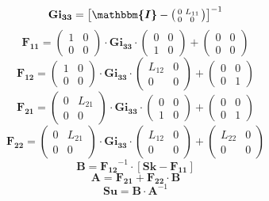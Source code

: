 \[ \mathbf{Gi_{33}} = \left[\boldsymbol{\mathbbm{I}}
-\left(\begin{smallmatrix} 0 & L_{11} \\ 0 & 0
\end{smallmatrix}\right)\right]^{-1} \]
\[ \mathbf{F_{11}} = \left(\begin{smallmatrix} 1 & 0 \\ 0 & 0
\end{smallmatrix}\right) \cdot\mathbf{Gi_{33}}\cdot
\left(\begin{smallmatrix} 0 & 0 \\ 1 & 0 \end{smallmatrix}\right) +
\left(\begin{smallmatrix} 0 & 0 \\ 0 & 0 \end{smallmatrix}\right) \]
\[ \mathbf{F_{12}} = \left(\begin{smallmatrix} 1 & 0 \\ 0 & 0
\end{smallmatrix}\right) \cdot\mathbf{Gi_{33}}\cdot
\left(\begin{smallmatrix} L_{12} & 0 \\ 0 & 0 \end{smallmatrix}\right)
+ \left(\begin{smallmatrix} 0 & 0 \\ 0 & 1 \end{smallmatrix}\right) \]
\[ \mathbf{F_{21}} = \left(\begin{smallmatrix} 0 & L_{21} \\ 0 & 0
\end{smallmatrix}\right) \cdot\mathbf{Gi_{33}}\cdot
\left(\begin{smallmatrix} 0 & 0 \\ 1 & 0 \end{smallmatrix}\right) +
\left(\begin{smallmatrix} 0 & 0 \\ 0 & 1 \end{smallmatrix}\right) \]
\[ \mathbf{F_{22}} = \left(\begin{smallmatrix} 0 & L_{21} \\ 0 & 0
\end{smallmatrix}\right) \cdot\mathbf{Gi_{33}}\cdot
\left(\begin{smallmatrix} L_{12} & 0 \\ 0 & 0 \end{smallmatrix}\right)
+ \left(\begin{smallmatrix} L_{22} & 0 \\ 0 & 0
\end{smallmatrix}\right) \]
\[ \mathbf{B}=\mathbf{F_{12}}^{-1}\cdot\left[ \mathbf{Sk} -
\mathbf{F_{11}} \right]  \]
\[ \mathbf{A}=\mathbf{F_{21}}+ \mathbf{F_{22}}\cdot\mathbf{B} \]
\[ \mathbf{Su} = \mathbf{B} \cdot \mathbf{A}^{-1} \]
